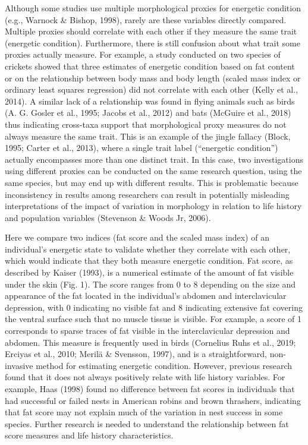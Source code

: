 \documentclass[
]{article}
\begin{document}
Although some studies use multiple morphological proxies for energetic
condition (e.g., Warnock \& Bishop, 1998), rarely are these variables
directly compared. Multiple proxies should correlate with each other if
they measure the same trait (energetic condition). Furthermore, there is
still confusion about what trait some proxies actually measure. For
example, a study conducted on two species of crickets showed that three
estimates of energetic condition based on fat content or on the
relationship between body mass and body length (scaled mass index or
ordinary least squares regression) did not correlate with each other
(Kelly et al., 2014). A similar lack of a relationship was found in
flying animals such as birds (A. G. Gosler et al., 1995; Jacobs et al.,
2012) and bats (McGuire et al., 2018) thus indicating cross-taxa support
that morphological proxy measures do not always measure the same trait.
This is an example of the jingle fallacy (Block, 1995; Carter et al.,
2013), where a single trait label (``energetic condition'') actually
encompasses more than one distinct trait. In this case, two
investigations using different proxies can be conducted on the same
research question, using the same species, but may end up with different
results. This is problematic because inconsistency in results among
researchers can result in potentially misleading interpretations of the
impact of variation in morphology in relation to life history and
population variables (Stevenson \& Woods Jr, 2006).

Here we compare two indices (fat score and the scaled mass index) of an
individual's energetic state to validate whether they correlate with
each other, which would indicate that they both measure energetic
condition. Fat score, as described by Kaiser (1993), is a numerical
estimate of the amount of fat visible under the skin (Fig. 1). The score
ranges from 0 to 8 depending on the size and appearance of the fat
located in the individual's abdomen and interclavicular depression, with
0 indicating no visible fat and 8 indicating extensive fat covering the
ventral surface such that no muscle tissue is visible. For example, a
score of 1 corresponds to sparse traces of fat visible in the
interclavicular depression and abdomen. This measure is frequently used
in birds (Cornelius Ruhs et al., 2019; Erciyas et al., 2010; Merilä \&
Svensson, 1997), and is a straightforward, non-invasive method for
estimating energetic condition. However, previous research found that it
does not always positively relate with life history variables. For
example, Haas (1998) found no difference between fat scores in
individuals that had successful or failed nests in American robins and
brown thrashers, indicating that fat score may not explain much of the
variation in nest success in some species. Further research is needed to
understand the relationship between fat score measures and life history
characteristics.
\end{document}
